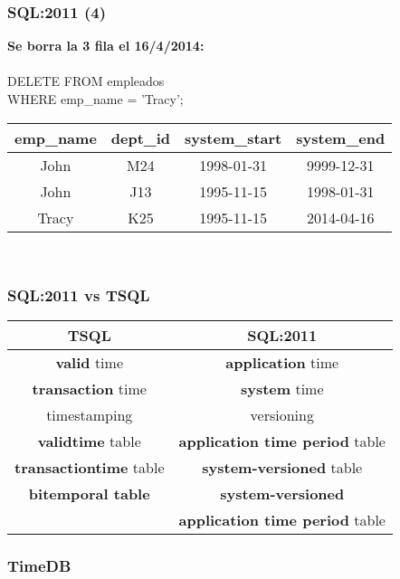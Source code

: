 \documentclass[12pt]{beamer}
\begin{document}
\begin{frame}
\frametitle{SQL:2011 (4)}
\textbf{Se borra la 3 fila el 16/4/2014:}\\
\ \\
DELETE FROM empleados\\
WHERE emp\_name = 'Tracy';

\begin{center}
\begin{tabular}{|c|c|c|c|}
\hline
emp\_name & dept\_id & system\_start & system\_end\\
\hline
John & M24 & 1998-01-31 & 9999-12-31\\
\hline
John & J13 & 1995-11-15 & 1998-01-31\\
\hline
Tracy & K25 & 1995-11-15 & 2014-04-16\\
\hline
\end{tabular}\\
\end{center}
\end{frame}


\begin{frame}
\frametitle{SQL:2011 vs TSQL}
\begin{tabular}{|c|c|}
\hline
TSQL & SQL:2011\\
\hline
\textbf{valid} time & \textbf{application} time\\
\textbf{transaction} time & \textbf{system} time\\
\hline
timestamping & versioning\\
\hline
\textbf{validtime} table & \textbf{application time period} table\\
\textbf{transactiontime} table & \textbf{system-versioned} table\\
\textbf{bitemporal table} & \textbf{system-versioned}\\
& \textbf{application time period} table\\
\hline

\end{tabular}
\end{frame}


\begin{frame}
\frametitle{TimeDB}
\ \\
\end{frame}
\end{document}
